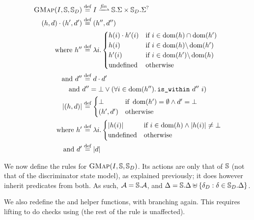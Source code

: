 \begin{align*}
	\GMap(I, \mmdl, \mmdl_D) &\defeq I \finmap \mmdl.\Sigma \times \mmdl_D.\Sigma^?\\
	(h,d)\cdot (h',d') &\defeq (h'', d'')\\
	\text{where } h''&\defeq \lambda i.\begin{cases}
		h(i)\cdot h'(i)&\If~i\in \dom(h)\cap\dom(h')\\
		h(i) &\If~i\in \dom(h) \backslash \dom(h')\\
		h'(i) &\If~i\in \dom(h') \backslash \dom(h)\\
		\text{undefined}&\Otherwise
	\end{cases}\\
	\text{and }d''&\defeq d\cdot d'\\
	\text{and }& d'' = \bot \lor (\forall i\in\dom(h'')\ldotp \code{is\_within}~d''~i)\\
	|(h, d)| &\defeq \begin{cases}
		\bot &\If~ \dom(h')=\emptyset \land d'=\bot\\
		(h',d') &\Otherwise
	\end{cases} \\
	\text{where } h' &\defeq\lambda i.\begin{cases}
		|h(i)| &\If~ i\in\dom(h) \land |h(i)| \neq \bot\\
		\text{undefined} &\Otherwise
	\end{cases} \\
	\text{and }d' &\defeq |d|
\end{align*}

We now define the rules for $\textsc{GMap}(I,\mathbb S,\mathbb S_D)$. Its actions are only that of $\mathbb S$ (not that of the discriminator state model), as explained previously; it does however inherit predicates from both. As such, ${\cal{A}} = \mathbb S.{\cal{A}}$, and ${\Delta =\mathbb S.\Delta \uplus \{\delta_D : \delta \in \mathbb S_D.\Delta \}}$.

We also redefine the  and  helper functions, with  branching again. This requires lifting  to do checks using  (the rest of the rule is unaffected).


